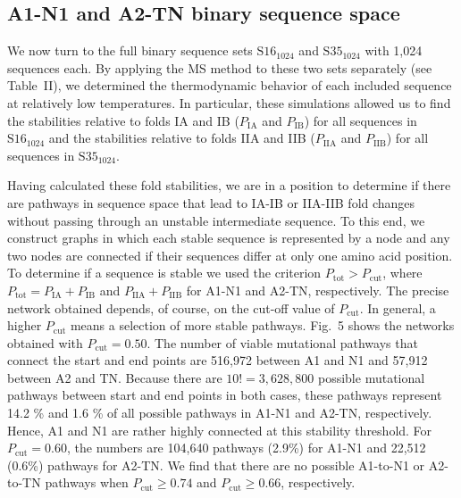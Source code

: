 \documentclass[
aip,
rsi,%
amsmath,amssymb,
reprint,%
]{revtex4-1}
\newcommand {\Pcut}     	{{P_\mathrm{cut}}}
\newcommand {\Ptot}	{{P_\mathrm{tot}}}
\newcommand {\PIA}    	{{P_\mathrm{IA}}}
\newcommand {\PIB}    	{{P_\mathrm{IB}}}
\newcommand {\PIIA}    	{{P_\mathrm{IIA}}}
\newcommand {\PIIB}    	{{P_\mathrm{IIB}}}
\newcommand {\SI}		{${\mathrm{S16}_{1024}}$}
\newcommand {\SII}		{${\mathrm{S35}_{1024}}$}
\begin{document}
\vspace{12pt}
\subsection{A1-N1 and A2-TN binary sequence space}
\noindent
We now turn to the full binary sequence sets {\SI} and {\SII} with 1,024 sequences each. By applying the MS method to these two sets separately (see Table~II), we determined the thermodynamic behavior of each included sequence at relatively low temperatures. In particular, these simulations allowed us to find the stabilities relative to folds IA and IB ($\PIA$ and $\PIB$) for all sequences in {\SI} and the stabilities relative to folds IIA and IIB ($\PIIA$ and $\PIIB$) for all sequences in {\SII}.

Having calculated these fold stabilities, we are in a position to determine if there are pathways in sequence space that lead to IA-IB or IIA-IIB fold changes without passing through an unstable intermediate sequence. To this end, we construct graphs in which each stable sequence is represented by a node and any two nodes are connected if their sequences differ at only one amino acid position. To determine if a sequence is stable we used the criterion $P_\mathrm{tot}>\Pcut$, where  $\Ptot = \PIA + \PIB$ and $\PIIA + \PIIB$ for A1-N1 and A2-TN, respectively. The precise network obtained depends, of course, on the cut-off value of $\Pcut$. In general, a higher $\Pcut$ means a selection of more stable pathways. Fig.~5 shows the networks obtained with $\Pcut=0.50$. The number of viable mutational pathways that connect the start and end points are 516,972 between A1 and N1 and  57,912 between A2 and TN. Because there are $10! =3,628,800$ possible mutational pathways between start and end points in both cases, these pathways represent 14.2 \% and 1.6 \% of all possible pathways in A1-N1 and A2-TN, respectively. Hence, A1 and N1 are rather highly connected at this stability threshold. For $\Pcut=0.60$, the numbers are 104,640 pathways (2.9\%) for A1-N1 and 22,512 (0.6\%) pathways for A2-TN. We find that there are no possible A1-to-N1 or A2-to-TN pathways when $\Pcut\ge0.74$ and $\Pcut\ge 0.66$, respectively. \\
\end{document}
